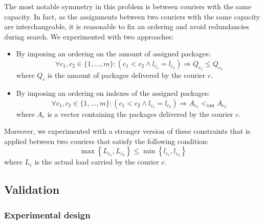 The most notable symmetry in this problem is between couriers with the same capacity. In fact, as the assignments between two couriers with the same capacity are interchangeable, it is reasonable to fix an ordering and avoid redundancies during search. We experimented with two approaches: 
\begin{itemize}
    \item By imposing an ordering on the amount of assigned packages:
        \begin{equation}
            \label{eq:cp_symm_amount}
            \forall c_1, c_2 \in \{ 1, \dots, m \}: (c_1 < c_2 \land l_{c_1} = l_{c_2}) \Rightarrow Q_{c_1} \leq Q_{c_2}
        \end{equation}
        where $Q_c$ is the amount of packages delivered by the courier $c$.
    \item By imposing an ordering on indexes of the assigned packages:
        \begin{equation}
            \label{eq:cp_symm_packs}
            \forall c_1, c_2 \in \{ 1, \dots, m \}: (c_1 < c_2 \land l_{c_1} = l_{c_2}) \Rightarrow A_{c_1} <_\texttt{lex} A_{c_2}
        \end{equation}
        where $A_c$ is a vector containing the packages delivered by the courier $c$.
\end{itemize}

Moreover, we experimented with a stronger version of these constraints that is applied between two couriers that satisfy the following condition:
\begin{equation}
    \label{eq:cp_symm_strong}
    \max\left\{ L_{c_1}, L_{c_2} \right\} \leq \min\left\{ l_{c_1}, l_{c_2} \right\}
\end{equation}
where $L_c$ is the actual load carried by the courier $c$.



\subsection{Validation}

\subsubsection{Experimental design}

